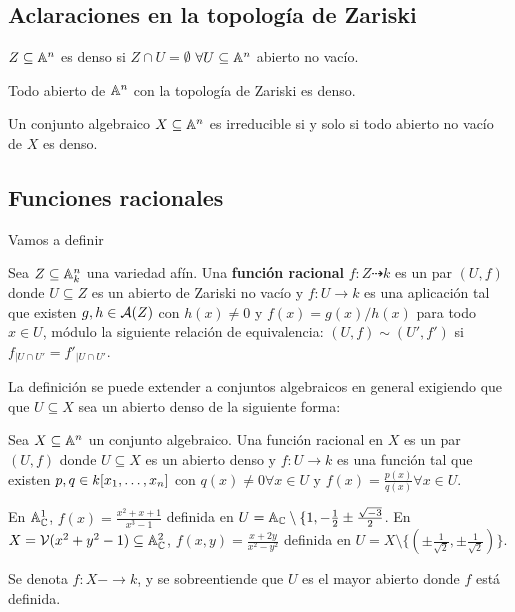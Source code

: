 \documentclass[ACGA.tex]{subfiles}
\begin{document}
\subsection{Aclaraciones en la topología de Zariski}
\begin{defi} $Z\subseteq\mathbb{A}^n$ es denso si $Z\cap U=\emptyset$ $\forall U\subseteq\mathbb{A}^n$ abierto no vacío.
\end{defi}

\begin{prop} Todo abierto de $\mathbb{A}^n$ con la topología de Zariski es denso.
\end{prop}

\begin{prop}
Un conjunto algebraico $X\subseteq\mathbb{A}^n$ es irreducible si y solo si todo abierto no vacío de $X$ es denso.
\end{prop}

\subsection{Funciones racionales}

Vamos a definir 
\begin{defi}
 Sea $Z\subseteq\mathbb{A}^n_k$ una variedad afín. Una {\bf función racional} $f:Z\dashrightarrow k$ es un par $(U,f)$ donde $U\subseteq Z$ es un abierto de Zariski no vacío y $f:U\to k$ es una aplicación tal que existen $g,h\in \mathcal{A}(Z)$ con $h(x)\neq 0$ y $f(x)=g(x)/h(x)$ para todo $x\in U$, módulo la siguiente relación de equivalencia: $(U,f)\sim(U',f')$ si $f_{\mid U\cap U'}=f'_{|U\cap U'}$.
\end{defi}


La definición se puede extender a conjuntos algebraicos en general exigiendo que que $U\subseteq X$ sea un abierto denso de la siguiente forma:

\begin{defi}
Sea $X\subseteq\mathbb{A}^n$ un conjunto algebraico. Una función racional en $X$ es un par $(U,f)$ donde $U\subseteq X$ es un abierto denso y $f:U\to k$ es una función tal que existen $p,q\in k[x_1,\dotsc,x_{n}]$ con $q(x)\neq 0\forall x\in U$ y $f(x)=\frac{p(x)}{q(x)}\forall x\in U$. 
\end{defi}

\begin{ej}
En $\mathbb{A}^1_{\mathbb{C}}$, $f(x)=\frac{x^2+x+1}{x^3-1}$ definida en $U=\mathbb{A}_{\mathbb{C}}\setminus\{1,-\frac{1}{2}\pm\frac{\sqrt{-3}}{2}$. En $X=\mathcal{V}(x^2+y^2-1)\subseteq\mathbb{A}^2_{\mathbb{C}}$, $f(x,y)=\frac{x+2y}{x^2-y^2}$ definida en $U=X\setminus\{(\pm\frac{1}{\sqrt{2}},\pm\frac{1}{\sqrt{2}})\}$.
\end{ej}
\begin{nota}
Se denota $f: X-\to k$, y se sobreentiende que $U$ es el mayor abierto donde $f$ está definida.
\end{nota}
\end{document}

